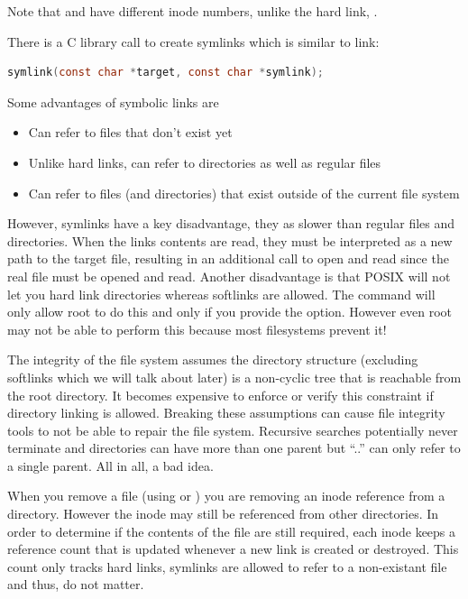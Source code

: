 Note that  and  have different inode numbers, unlike the hard link, .

There is a C library call to create symlinks which is similar to link:

\begin{lstlisting}[language=C]
symlink(const char *target, const char *symlink);
\end{lstlisting}

Some advantages of symbolic links are

\begin{itemize}
\tightlist
\item
  Can refer to files that don't exist yet
\item
  Unlike hard links, can refer to directories as well as regular files
\item
  Can refer to files (and directories) that exist outside of the current file system
\end{itemize}

However, symlinks have a key disadvantage, they as slower than regular files and directories. When the links contents are read, they must be interpreted as a new path to the target file, resulting in an additional call to open and read since the real file must be opened and read. Another disadvantage is that POSIX will not let you hard link directories whereas softlinks are allowed. The  command will only allow root to do this and only if you provide the  option. However even root may not be able to perform this because most filesystems prevent it!

The integrity of the file system assumes the directory structure (excluding softlinks which we will talk about later) is a non-cyclic tree that is reachable from the root directory. It becomes expensive to enforce or verify this constraint if directory linking is allowed. Breaking these assumptions can cause file integrity tools to not be able to repair the file system. Recursive searches potentially never terminate and directories can have more than one parent but ``..'' can only refer to a single parent. All in all, a bad idea.

When you remove a file (using  or ) you are removing an inode reference from a directory. However the inode may still be referenced from other directories. In order to determine if the contents of the file are still required, each inode keeps a reference count that is updated whenever a new link is created or destroyed. This count only tracks hard links, symlinks are allowed to refer to a non-existant file and thus, do not matter.

